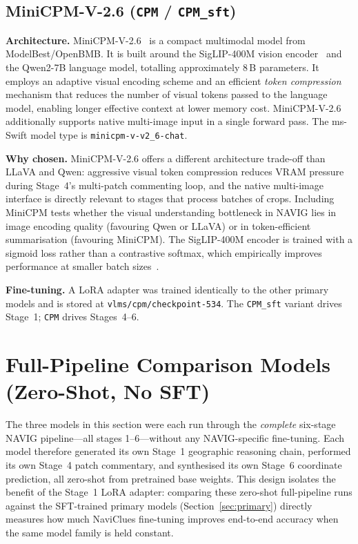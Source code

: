 \documentclass[11pt]{article}
\begin{document}
\subsection{MiniCPM-V-2.6 (\texttt{CPM} / \texttt{CPM\_sft})}

\textbf{Architecture.} MiniCPM-V-2.6~\citep{Yao2024MiniCPMV} is a compact multimodal model
from ModelBest/OpenBMB. It is built around the SigLIP-400M vision
encoder~\citep{Zhai2023SigLIP} and the Qwen2-7B language model, totalling approximately
8\,B parameters. It employs an adaptive visual encoding scheme and an efficient \emph{token
compression} mechanism that reduces the number of visual tokens passed to the language model,
enabling longer effective context at lower memory cost. MiniCPM-V-2.6 additionally supports
native multi-image input in a single forward pass. The ms-Swift model type is
\texttt{minicpm-v-v2\_6-chat}.

\textbf{Why chosen.} MiniCPM-V-2.6 offers a different architecture trade-off than LLaVA and
Qwen: aggressive visual token compression reduces VRAM pressure during Stage~4's multi-patch
commenting loop, and the native multi-image interface is directly relevant to stages that
process batches of crops. Including MiniCPM tests whether the visual understanding bottleneck
in NAVIG lies in image encoding quality (favouring Qwen or LLaVA) or in token-efficient
summarisation (favouring MiniCPM). The SigLIP-400M encoder is trained with a sigmoid loss
rather than a contrastive softmax, which empirically improves performance at smaller batch
sizes~\citep{Zhai2023SigLIP}.

\textbf{Fine-tuning.} A LoRA adapter was trained identically to the other primary models
and is stored at \texttt{vlms/cpm/checkpoint-534}. The \texttt{CPM\_sft} variant drives
Stage~1; \texttt{CPM} drives Stages~4--6.

\section{Full-Pipeline Comparison Models (Zero-Shot, No SFT)}
\label{sec:cmp}

The three models in this section were each run through the \emph{complete} six-stage
NAVIG pipeline---all stages 1--6---without any NAVIG-specific fine-tuning. Each model
therefore generated its own Stage~1 geographic reasoning chain, performed its own
Stage~4 patch commentary, and synthesised its own Stage~6 coordinate prediction,
all zero-shot from pretrained base weights. This design isolates the benefit of the
Stage~1 LoRA adapter: comparing these zero-shot full-pipeline runs against the
SFT-trained primary models (Section~\ref{sec:primary}) directly measures how much
NaviClues fine-tuning improves end-to-end accuracy when the same model family is
held constant.
\end{document}
